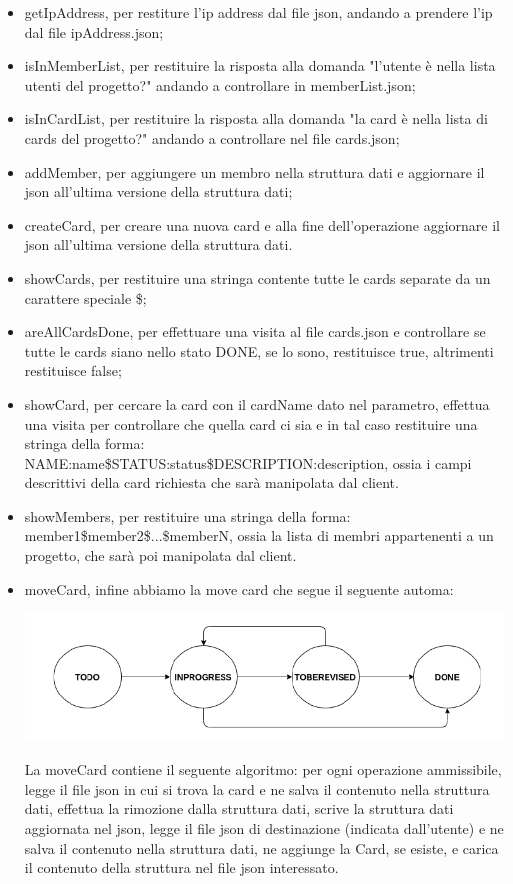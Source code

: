 \documentclass[]{article}
\begin{document}
\begin{itemize}
	\item getIpAddress, per restiture l'ip address dal file json, andando a prendere l'ip dal file ipAddress.json;
	\item isInMemberList, per restituire la risposta alla domanda "l'utente è nella lista utenti del progetto?" andando a controllare in memberList.json;
	\item isInCardList, per restituire la risposta alla domanda "la card è nella lista di cards del progetto?" andando a controllare nel file cards.json;
	\item addMember, per aggiungere un membro nella struttura dati e aggiornare il json all'ultima versione della struttura dati;
	\item createCard, per creare una nuova card e alla fine dell'operazione aggiornare il json all'ultima versione della struttura dati.
	\item showCards, per restituire una stringa contente tutte le cards separate da un carattere speciale \$;
	\item areAllCardsDone, per effettuare una visita al file cards.json e controllare se tutte le cards siano nello stato DONE, se lo sono, restituisce true, altrimenti restituisce false;
	\item showCard, per cercare la card con il cardName dato nel parametro, effettua una visita per controllare che quella card ci sia e in tal caso restituire una stringa della forma:\\
	NAME:name\$STATUS:status\$DESCRIPTION:description,
	ossia i campi descrittivi della card richiesta che sarà manipolata dal client.
	\item showMembers, per restituire una stringa della forma:\\
	member1\$member2\$...\$memberN,
	ossia la lista di membri appartenenti a un progetto, che sarà poi manipolata dal client.
	\item moveCard, infine abbiamo la move card che segue il seguente automa:
	\label{moveCard}
	\begin{center}
		\includegraphics[scale=.5]{graphStatus}
	\end{center}
	La moveCard contiene il seguente algoritmo: per ogni operazione ammissibile, legge il file json in cui si trova la card e ne salva il contenuto nella struttura dati, effettua la rimozione dalla struttura dati, scrive la struttura dati aggiornata nel json, legge il file json di destinazione (indicata dall'utente) e ne salva il contenuto nella struttura dati, ne aggiunge la Card, se esiste, e carica il contenuto della struttura nel file json interessato.
\end{itemize}
\end{document}
